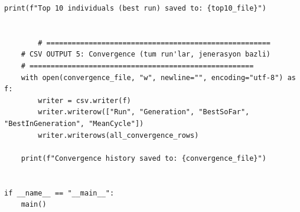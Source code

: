 \documentclass[12pt,a4paper]{article}
\begin{document}
\begin{lstlisting}[style=atomone,
caption={Python implementation of the genetic algorithm for the U-shaped assembly line balancing problem (UALBP-II) on the ARC83 instance.},
label={lst:ga-arc83-full}]
    print(f"Top 10 individuals (best run) saved to: {top10_file}")


        # =====================================================
    # CSV OUTPUT 5: Convergence (tum run'lar, jenerasyon bazli)
    # =====================================================
    with open(convergence_file, "w", newline="", encoding="utf-8") as f:
        writer = csv.writer(f)
        writer.writerow(["Run", "Generation", "BestSoFar", "BestInGeneration", "MeanCycle"])
        writer.writerows(all_convergence_rows)

    print(f"Convergence history saved to: {convergence_file}")


if __name__ == "__main__":
    main()
\end{lstlisting}
\end{document}

